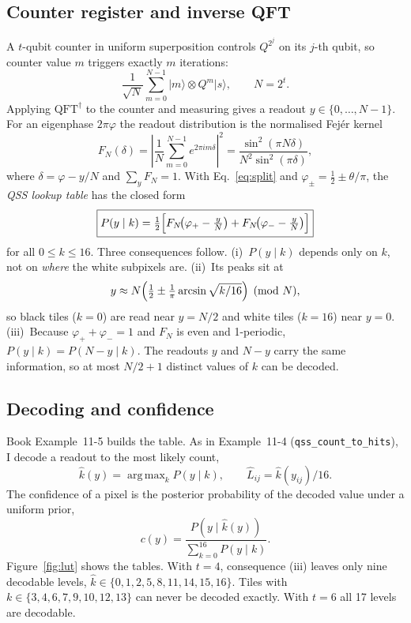 \documentclass[10pt,twocolumn,a4paper]{article}
\newcommand{\ket}[1]{\lvert #1\rangle}
\DeclareMathOperator*{\argmax}{arg\,max}
\begin{document}
\subsection{Counter register and inverse QFT}
A $t$-qubit counter in uniform superposition controls $Q^{2^j}$ on its
$j$-th qubit, so counter value $m$ triggers exactly $m$ iterations:
\begin{equation}
\frac{1}{\sqrt N}\sum_{m=0}^{N-1}\ket{m}\otimes Q^{m}\ket{s},\qquad N=2^t .
\end{equation}
Applying $\mathrm{QFT}^{\dagger}$ to the counter and measuring gives a
readout $y\in\{0,\dots,N-1\}$. For an eigenphase $2\pi\varphi$ the readout
distribution is the normalised Fej\'er kernel
\begin{equation}
F_N(\delta)=\left|\frac1N\sum_{m=0}^{N-1}e^{2\pi i m\delta}\right|^2
=\frac{\sin^2(\pi N\delta)}{N^2\sin^2(\pi\delta)},
\label{eq:fejer}
\end{equation}
where $\delta=\varphi-y/N$ and $\sum_y F_N=1$. With Eq.~\eqref{eq:split} and
$\varphi_\pm=\tfrac12\pm\theta/\pi$, the \emph{QSS lookup table} has the closed
form
\begin{equation}
\boxed{P(y\mid k)=\tfrac12\Bigl[F_N\!\bigl(\varphi_+-\tfrac yN\bigr)
+F_N\!\bigl(\varphi_- -\tfrac yN\bigr)\Bigr]}
\label{eq:lut}
\end{equation}
for all $0\le k\le16$. Three consequences follow.
(i)~$P(y\mid k)$ depends only on $k$, not on \emph{where} the white subpixels
are.
(ii)~Its peaks sit at
\begin{equation}
y\approx N\Bigl(\tfrac12\pm\tfrac{1}{\pi}\arcsin\sqrt{k/16}\Bigr)\pmod N ,
\end{equation}
so black tiles ($k=0$) are read near $y=N/2$ and white tiles ($k=16$) near
$y=0$.
(iii)~Because $\varphi_++\varphi_-=1$ and $F_N$ is even and 1-periodic,
$P(y\mid k)=P(N-y\mid k)$. The readouts $y$ and $N-y$ carry the same
information, so at most $N/2+1$ distinct values of $k$ can be decoded.

\subsection{Decoding and confidence}
Book Example~11-5 builds the table. As in Example~11-4
(\texttt{qss\_count\_to\_hits}), I decode a readout to the most likely
count,
\begin{equation}
\hat k(y)=\argmax_{k}P(y\mid k),\qquad \hat L_{ij}=\hat k(y_{ij})/16 .
\end{equation}
The confidence of a pixel is the posterior probability of the decoded value
under a uniform prior,
\begin{equation}
c(y)=\frac{P(y\mid\hat k(y))}{\sum_{k=0}^{16}P(y\mid k)} .
\label{eq:conf}
\end{equation}
Figure~\ref{fig:lut} shows the tables. With $t=4$, consequence (iii) leaves
only nine decodable levels, $\hat k\in\{0,1,2,5,8,11,14,15,16\}$. Tiles with
$k\in\{3,4,6,7,9,10,12,13\}$ can never be decoded exactly. With $t=6$ all 17
levels are decodable.
\end{document}
